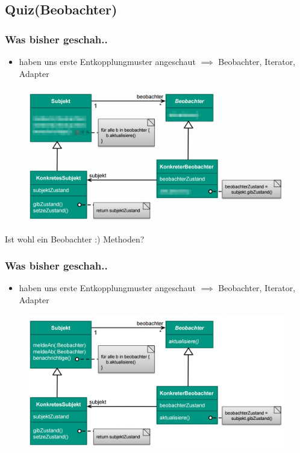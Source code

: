 \documentclass[18pt]{beamer}
\begin{document}
	\subsection{Quiz(Beobachter)}
	
	\begin{frame}
		\frametitle{Was bisher geschah..}
		\begin{itemize}
			\item haben uns erste Entkopplungmuster angeschaut
			\linebreak $\implies$ Beobachter, Iterator, Adapter
		\end{itemize}
		\begin{figure}
			\includegraphics[scale=0.25]{./pics/tut4/obs-mod.png}
		\end{figure}
		\pause Ist wohl ein Beobachter :) \pause Methoden?
	\end{frame}
	
	\begin{frame}
		\frametitle{Was bisher geschah..}
		\begin{itemize}
			\item haben uns erste Entkopplungmuster angeschaut
			\linebreak $\implies$ Beobachter, Iterator, Adapter
		\end{itemize}
		\begin{figure}
			\includegraphics[scale=0.35]{./pics/tut3/obs.png}
		\end{figure}
	\end{frame}
\end{document}
